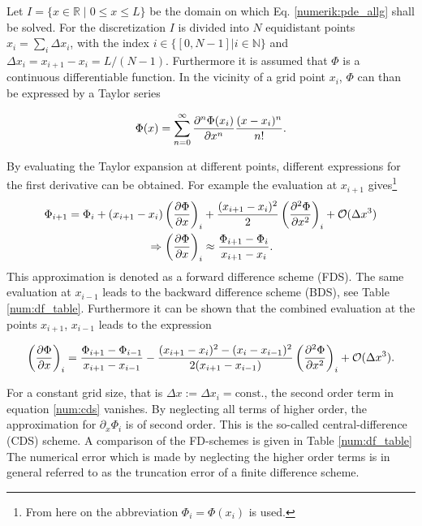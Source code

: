 Let $I = \{x \in \mathbb{R} \;|\; 0 \leq x \leq L\}$ be the domain on which Eq. \ref{numerik:pde_allg} shall be solved.
For the discretization $I$ is divided into $N$ equidistant points $x_i = \sum_i \Delta x_i$, with the index ${i\in\{[0, N-1]|i\in\mathbb{N}\}}$
and ${\Delta x_i = x_{i+1} - x_i = L/(N-1)}$.
Furthermore it is assumed that $\Phi$ is a  continuous differentiable function.
In the vicinity of a grid point $x_i$, $\Phi$ can than be expressed by a Taylor series

\begin{align}
    \label{num:taylor}
    \Phi(x) = \sum_{n=0}^{\infty} \pdn[^n\Phi(x_i)]{x^n} \frac{(x - x_i)^n}{n!}.
\end{align}

By evaluating the Taylor expansion at different points, different expressions for the first derivative can be obtained.
For example the evaluation at $x_{i+1}$ gives\footnote{From here on the abbreviation $\Phi_i=\Phi(x_i)$ is used.}
\begin{align}
    \Phi_{i+1}  = \Phi_i + (x_{i+1} - x_i)\left(\pdn[\Phi]{x}\right)_i &+ \frac{(x_{i+1} -x_i)^2}{2}\left(\pdn[^2\Phi]{x^2}\right)_i + \mathcal{O}(\Delta x^3)\\
            \Rightarrow \left(\pdn[\Phi]{x}\right)_i &\approx \frac{\Phi_{i+1} - \Phi_{i}}{x_{i+1} - x_i}.
\end{align}
This approximation is denoted as a forward difference scheme (FDS). The same evaluation at $x_{i-1}$ leads to the backward difference scheme (BDS), see Table \ref{num:df_table}.
Furthermore it can be shown that the combined evaluation at the points $x_{i+1}$, $x_{i-1}$ leads to the expression

\begin{align}
    \label{num:cds}
    \left(\pdn[\Phi]{x}\right)_{i} = \frac{\Phi_{i+1} - \Phi_{i-1}}{x_{i+1} - x_{i-1}}
     - \frac{(x_{i+1} - x_i)^2 - (x_i - x_{i-1})^2}{2 (x_{i+1} - x_{i-1})}\left(\pdn[^2\Phi]{x^2}\right)_i + \mathcal{O}(\Delta x^3).
\end{align}

For a constant grid size, that is $\Delta x := \Delta x_i = \text{const.}$, the second order term in equation \ref{num:cds} vanishes.
By neglecting all terms of higher order, the approximation for $\partial_x \Phi_i$ is of second order.
This is the so-called central-difference (CDS) scheme. A comparison of the FD-schemes is given in Table \ref{num:df_table}
The numerical error which is made by neglecting the higher order terms is in general referred to as the truncation error of a finite difference scheme.


